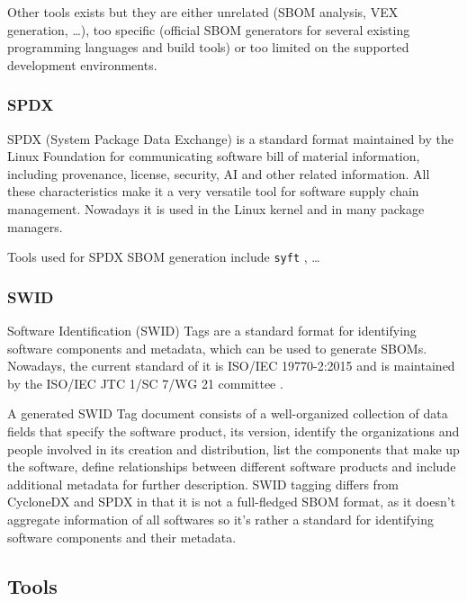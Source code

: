 Other tools exists but they are either unrelated (SBOM analysis, VEX generation, \dots), too specific (official SBOM generators for several existing programming languages and build tools) or too limited on the supported development environments.

\subsubsection{SPDX} \label{methodology:standard:spdx}

SPDX (System Package Data Exchange) \cite{standards:sbom:spdx} is a standard format maintained by the Linux Foundation for communicating software bill of material information, including provenance, license, security, AI and other related information.
All these characteristics make it a very versatile tool for software supply chain management. Nowadays it is used in the Linux kernel and in many package managers.

Tools used for SPDX SBOM generation include \verb|syft| \cite{repository:cyclonedx:syft}, \dots

\subsubsection{SWID} \label{methodology:standard:swid}

Software Identification (SWID) Tags \cite{standards:sbom:swid} are a standard format for identifying software components and metadata, which can be used to generate SBOMs. Nowadays, the current standard of it is ISO/IEC 19770-2:2015 \cite{standards:swid:iso19770-2:2015} and is maintained by the ISO/IEC JTC 1/SC 7/WG 21 committee \cite{standards:swid:committee}.

A generated SWID Tag document consists of a well-organized collection of data fields that specify the software product, its version, identify the organizations and people involved in its creation and distribution, list the components that make up the software, define relationships between different software products and include additional metadata for further description.
SWID tagging differs from CycloneDX and SPDX in that it is not a full-fledged SBOM format, as it doesn't aggregate information of all softwares so it's rather a standard for identifying software components and their metadata.


\subsection{Tools} \label{methodology:tools}


